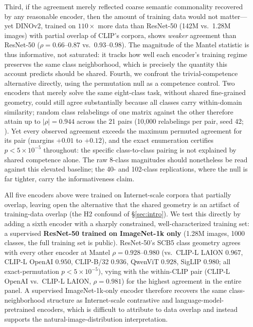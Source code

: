 \documentclass[a4paper,fleqn]{cas-sc}
\begin{document}
Third, if the agreement merely reflected coarse semantic commonality recovered by any reasonable encoder, then the amount of training data would not matter---yet DINOv2, trained on $110\times$ more data than ResNet-50 (142M vs.\ 1.28M images) with partial overlap of CLIP's corpora, shows \emph{weaker} agreement than ResNet-50 ($\rho=0.66$--$0.87$ vs.\ $0.93$--$0.98$). The magnitude of the Mantel statistic is thus informative, not saturated: it tracks how well each encoder's training regime preserves the same class neighborhood, which is precisely the quantity this account predicts should be shared. Fourth, we confront the trivial-competence alternative directly, using the permutation null as a competence control. Two encoders that merely solve the same eight-class task, without shared fine-grained geometry, could still agree substantially because all classes carry within-domain similarity; random class relabelings of one matrix against the other therefore attain up to $|\rho|=0.944$ across the 21 pairs (10{,}000 relabelings per pair, seed 42; ). Yet every observed agreement exceeds the maximum permuted agreement for its pair (margins $+0.01$ to $+0.12$), and the exact enumeration certifies $p<5\times10^{-5}$ throughout: the specific class-to-class pairing is not explained by shared competence alone. The raw 8-class magnitudes should nonetheless be read against this elevated baseline; the 40- and 102-class replications, where the null is far tighter, carry the informativeness claim.

All five encoders above were trained on Internet-scale corpora that partially overlap, leaving open the alternative that the shared geometry is an artifact of training-data overlap (the H2 confound of \S\ref{sec:intro}). We test this directly by adding a sixth encoder with a sharply constrained, well-characterized training set: a supervised \textbf{ResNet-50 trained on ImageNet-1k only} \cite{he2016deep} (1.28M images, 1000 classes, the full training set is public). ResNet-50's SCB5 class geometry agrees with every other encoder at Mantel $\rho=0.928$--$0.980$ (vs.\ CLIP-L LAION $0.967$, CLIP-L OpenAI $0.950$, CLIP-B/32 $0.936$, QwenViT $0.928$, SigLIP $0.980$; all exact-permutation $p<5\times10^{-5}$), vying with the within-CLIP pair (CLIP-L OpenAI vs.\ CLIP-L LAION, $\rho=0.981$) for the highest agreement in the entire panel. A supervised ImageNet-1k-only encoder therefore recovers the same class-neighborhood structure as Internet-scale contrastive and language-model-pretrained encoders, which is difficult to attribute to data overlap and instead supports the natural-image-distribution interpretation.
\end{document}
